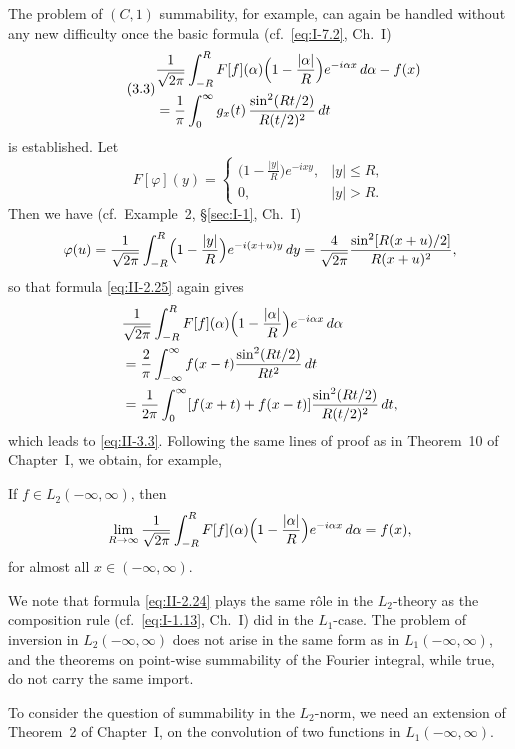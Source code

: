 The problem of $(C,1)$ summability, for example, can again be handled without any new difficulty once the basic formula (cf.\ \eqref{eq:I-7.2}, Ch.~I)
\begin{equation}\tag{3.3}\label{eq:II-3.3}
\begin{aligned}
&\frac{1}{\sqrt{2\pi}}  \int_{-R}^{R}F[f](\alpha)  \Bigl(1-\frac{|\alpha|}{R}\Bigr)e^{-i\alpha x}\,d\alpha - f(x)\\
&= \frac{1}{\pi}  \int_{0}^{\infty}g_{x}(t)\,\frac{\sin^{2}(Rt/2)}{R(t/2)^{2}}\,dt
\end{aligned}
\end{equation}
is established. Let
\[
F[\varphi](y)=
\begin{cases}
\bigl(1-\frac{|y|}{R}\bigr)e^{-ixy}, & |y|\le R,\\
0, & |y|>R.
\end{cases}
\]
Then we have (cf.\ Example~2, \S\ref{sec:I-1}, Ch.~I)
\[
\varphi(u)=\frac{1}{\sqrt{2\pi}}\int_{-R}^{R}\Bigl(1-\frac{|y|}{R}\Bigr)e^{-i(x+u)y}\,dy
=\frac{4}{\sqrt{2\pi}}\frac{\sin^{2}[R(x+u)/2]}{R(x+u)^{2}},
\]
so that formula \eqref{eq:II-2.25} again gives
\[
\begin{aligned}
&\frac{1}{\sqrt{2\pi}}\int_{-R}^{R}F[f](\alpha)\Bigl(1-\frac{|\alpha|}{R}\Bigr)e^{-i\alpha x}\,d\alpha\\
&= \frac{2}{\pi}\int_{-\infty}^{\infty}f(x-t)\frac{\sin^{2}(Rt/2)}{Rt^{2}}\,dt\\
&= \frac{1}{2\pi}\int_{0}^{\infty}[f(x+t)+f(x-t)]\frac{\sin^{2}(Rt/2)}{R(t/2)^{2}}\,dt,
\end{aligned}
\]
which leads to \eqref{eq:II-3.3}. Following the same lines of proof as in Theorem~10 of Chapter~I, we obtain, for example,

\begin{theorem}\label{thm:II-3}
If $f\in L_{2}(-\infty,\infty)$, then
\[
\lim_{R\to\infty}\frac{1}{\sqrt{2\pi}}\int_{-R}^{R}F[f](\alpha)\Bigl(1-\frac{|\alpha|}{R}\Bigr)e^{-i\alpha x}\,d\alpha=f(x),
\]
for almost all $x\in(-\infty,\infty)$.
\end{theorem}

We note that formula \eqref{eq:II-2.24} plays the same r\^ole in the $L_{2}$-theory as the composition rule (cf.\ \eqref{eq:I-1.13}, Ch.~I) did in the $L_{1}$-case. The problem of inversion in $L_{2}(-\infty,\infty)$ does not arise in the same form as in $L_{1}(-\infty,\infty)$, and the theorems on point-wise summability of the Fourier integral, while true, do not carry the same import.

To consider the question of summability in the $L_{2}$-norm, we need an extension of Theorem~2 of Chapter~I, on the convolution of two functions in $L_{1}(-\infty,\infty)$.

